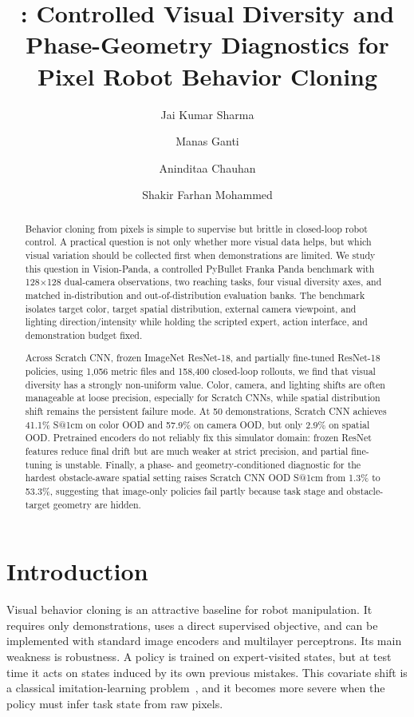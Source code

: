 \documentclass[10pt,twocolumn,letterpaper]{article}
\title{\method{}: Controlled Visual Diversity and Phase-Geometry Diagnostics for Pixel Robot Behavior Cloning}
\author{
Jai Kumar Sharma \and
Manas Ganti \and
Aninditaa Chauhan \and
Shakir Farhan Mohammed
}
\date{}
\makeatletter
\newcommand{\method}{Vision-Panda}
\newcommand{\sone}{S@1cm}
\makeatother
\begin{document}
\maketitle

\begin{abstract}
Behavior cloning from pixels is simple to supervise but brittle in closed-loop robot control. A practical question is not only whether more visual data helps, but which visual variation should be collected first when demonstrations are limited. We study this question in \method{}, a controlled PyBullet Franka Panda benchmark with 128$\times$128 dual-camera observations, two reaching tasks, four visual diversity axes, and matched in-distribution and out-of-distribution evaluation banks. The benchmark isolates target color, target spatial distribution, external camera viewpoint, and lighting direction/intensity while holding the scripted expert, action interface, and demonstration budget fixed.

Across Scratch CNN, frozen ImageNet ResNet-18, and partially fine-tuned ResNet-18 policies, using 1,056 metric files and 158,400 closed-loop rollouts, we find that visual diversity has a strongly non-uniform value. Color, camera, and lighting shifts are often manageable at loose precision, especially for Scratch CNNs, while spatial distribution shift remains the persistent failure mode. At 50 demonstrations, Scratch CNN achieves 41.1\% \sone{} on color OOD and 57.9\% on camera OOD, but only 2.9\% on spatial OOD. Pretrained encoders do not reliably fix this simulator domain: frozen ResNet features reduce final drift but are much weaker at strict precision, and partial fine-tuning is unstable. Finally, a phase- and geometry-conditioned diagnostic for the hardest obstacle-aware spatial setting raises Scratch CNN OOD \sone{} from 1.3\% to 53.3\%, suggesting that image-only policies fail partly because task stage and obstacle-target geometry are hidden.
\end{abstract}

\section{Introduction}
Visual behavior cloning is an attractive baseline for robot manipulation. It requires only demonstrations, uses a direct supervised objective, and can be implemented with standard image encoders and multilayer perceptrons. Its main weakness is robustness. A policy is trained on expert-visited states, but at test time it acts on states induced by its own previous mistakes. This covariate shift is a classical imitation-learning problem~\cite{ross2011dagger}, and it becomes more severe when the policy must infer task state from raw pixels.
\end{document}

